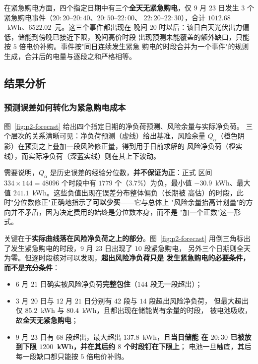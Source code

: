 \documentclass[withoutpreface,bwprint]{cumcmthesis}
\begin{document}
在紧急购电方面，四个指定日期中有三个\textbf{全天无紧急购电}，仅 $9$ 月
$23$ 日发生 $3$ 个紧急购电事件（$20{:}20$--$20{:}40$、$20{:}50$--$22{:}00$、
$22{:}20$--$22{:}30$），合计 $1012.68$~kWh、$6522.02$~元。这三个事件都出现在
晚间 $20$ 时以后：该日白天光伏出力偏低，储能到傍晚已接近下限，晚间高价时段
出现预测未能覆盖的额外缺口，只能按 $5$ 倍电价补购。事件按"同日连续发生紧急
购电的时段合并为一个事件"的规则生成，合并后的电量与逐段之和严格相等。

\subsection{结果分析}

\subsubsection{预测误差如何转化为紧急购电成本}

图~\ref{fig:p2-forecast} 给出四个指定日期的净负荷预测、风险余量与实际净负荷。
三个层次的关系清晰可见：净负荷预测（虚线）给出基准，风险余量
$Q_{\alpha}$（橙色阴影）在预测之上叠加一段风险修正量，得到用于日前求解的
风险净负荷（橙实线），而实际净负荷（深蓝实线）则在其上下波动。

需要说明，$Q_{\alpha}$ 是历史误差的经验分位数，\textbf{并不保证为正}：正式
区间 $334\times144=48096$ 个时段中有 $1779$ 个（$3.7\%$）为负，最小值
$-30.9$~kWh、最大值 $241.1$~kWh。这些负值出现在误差分布整体偏负（长期被
高估）的时段，此时"分位数修正"正确地指示了\textbf{可以少买}——它与总体上
"风险余量抬高计划量"的方向并不矛盾，因为决定费用的始终是分位数本身，而不是
"加一个正数"这一形式。

关键在于\textbf{实际曲线落在风险净负荷之上的部分}。图~\ref{fig:p2-forecast}
用倒三角标出了发生紧急购电的时段，$9$ 月 $23$ 日出现了 $10$ 段紧急购电，
另外三个日期则全天为零。但逐时段核对可以发现，\textbf{超出风险净负荷只是
发生紧急购电的必要条件，而不是充分条件}：

\begin{itemize}
  \item $6$ 月 $21$ 日确实被风险净负荷\textbf{完整包住}（$144$ 段无一段超出）；
  \item $3$ 月 $20$ 日与 $12$ 月 $21$ 日分别有 $42$ 段与 $14$ 段超出风险净负荷，
        但最大超出仅 $85.2$~kWh 与 $80.4$~kWh，且都出现在储能尚有余量的时段，
        被电池吸收，故\textbf{全天无紧急购电}；
  \item $9$ 月 $23$ 日有 $68$ 段超出，最大超出 $137.8$~kWh，且\textbf{当日储能
        在 $20{:}30$ 已被放到下限 $1200$~kWh，并在其后约 $8$ 个时段钉在下限上}；
        电池一旦触底，其后每一段缺口都只能按 $5$ 倍电价补购。
\end{itemize}
\end{document}
